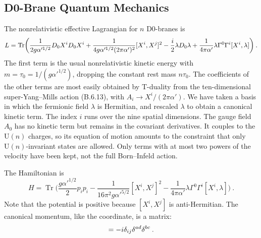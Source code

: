 \subsection*{D0-Brane Quantum Mechanics}

The nonrelativistic effective Lagrangian for $n$ D0-branes is
\begin{equation}
	L = \operatorname{Tr}\biggl(\frac{1}{2g\alpha'^{1/2}}D_0 X^i D_0 X^i + \frac{1}{4g\alpha'^{1/2}(2\pi\alpha')^2}[X^i,X^j]^2 - \frac{i}{2}\lambda D_0\lambda + \frac{1}{4\pi\alpha'}\lambda\Gamma^0\Gamma^i[X^i,\lambda]\biggr) \:. \label{13.5.13}
\end{equation}
The first term is the usual nonrelativistic kinetic energy with $m = \tau_0 = 1/(g\alpha'^{1/2})$, dropping the constant rest mass $n\tau_0$. The coefficients of the other terms are most easily obtained by T-duality from the ten-dimensional super-Yang--Mills action (B.6.13), with $A_i \to X^i/(2\pi\alpha')$. We have taken a basis in which the fermionic field $\lambda$ is Hermitian, and rescaled $\lambda$ to obtain a canonical kinetic term. The index $i$ runs over the nine spatial dimensions. The gauge field $A_0$ has no kinetic term but remains in the covariant derivatives. It couples to the $\mathrm{U}(n)$ charges, so its equation of motion amounts to the constraint that only $\mathrm{U}(n)$-invariant states are allowed. Only terms with at most two powers of the velocity have been kept, not the full Born--Infeld action.

The Hamiltonian is
\begin{equation}
	H = \operatorname{Tr}\biggl(\frac{g\alpha'^{1/2}}{2}p_i p_i - \frac{1}{16\pi^2 g\alpha'^{5/2}}[X^i,X^j]^2 - \frac{1}{4\pi\alpha'}\lambda\Gamma^0\Gamma^i[X^i,\lambda]\biggr) \:. \label{13.5.14}
\end{equation}
Note that the potential is positive because $[X^i,X^j]$ is anti-Hermitian. The canonical momentum, like the coordinate, is a matrix:
\begin{equation}
	[p_i^{ab}, X_j^{cd}] = -\mi\delta_{ij}\delta^{ad}\delta^{bc} \:. \label{13.5.15}
\end{equation}

